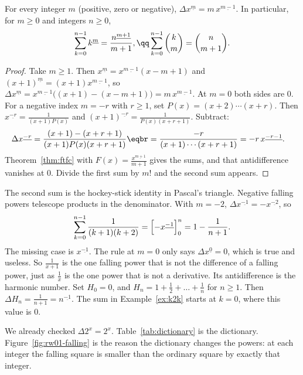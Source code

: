 \begin{proposition}\label{prop:falling}
For every integer $m$ (positive, zero or negative), $\Delta x^{\underline m}=m\,x^{\underline{m-1}}$. In particular,
for $m\ge0$ and integers $n\ge0$,
\[
\sum_{k=0}^{n-1}k^{\underline m}=\frac{n^{\underline{m+1}}}{m+1},\qq\sum_{k=0}^{n-1}\binom km=\binom n{m+1}.
\]
\end{proposition}
\begin{proof}
Take $m\ge1$. Then $x^{\underline m}=x^{\underline{m-1}}(x-m+1)$ and $(x+1)^{\underline m}=(x+1)x^{\underline{m-1}}$, so
$\Delta x^{\underline m}=x^{\underline{m-1}}\bigl((x+1)-(x-m+1)\bigr)=m\,x^{\underline{m-1}}$. At $m=0$ both sides are
$0$. For a negative index $m=-r$ with $r\ge1$, set $P(x)=(x+2)\cdots(x+r)$. Then $x^{\underline{-r}}=\frac1{(x+1)P(x)}$ and
$(x+1)^{\underline{-r}}=\frac1{P(x)(x+r+1)}$. Subtract:
\[
\begin{aligned}\Delta x^{\underline{-r}}&=\frac{(x+1)-(x+r+1)}{(x+1)P(x)(x+r+1)}\eqbr=\frac{-r}{(x+1)\cdots(x+r+1)}=-r\,x^{\underline{-r-1}}.\end{aligned}
\]
Theorem~\ref{thm:ftfc} with $F(x)=\frac{x^{\underline{m+1}}}{m+1}$ gives the sums, and that antidifference vanishes at $0$. Divide the first sum by $m!$ and the second sum appears.
\end{proof}

The second sum is the hockey-stick identity in Pascal's triangle. Negative falling powers telescope products in the denominator. With $m=-2$, $\Delta x^{\underline{-1}}=-x^{\underline{-2}}$, so
\[
\sum_{k=0}^{n-1}\frac1{(k+1)(k+2)}=\Bigl[-x^{\underline{-1}}\Bigr]_0^n=1-\frac1{n+1}.
\]
The missing case is $x^{\underline{-1}}$. The rule at $m=0$ only says $\Delta x^{\underline 0}=0$, which is true and useless. So $\frac1{x+1}$ is the one falling power that is not the difference of a falling power, just as $\frac1x$ is the one power that is not a derivative. Its antidifference is the harmonic number. Set $H_0=0$, and $H_n=1+\frac12+\dots+\frac1n$ for $n\ge1$. Then $\Delta H_n=\frac1{n+1}=n^{\underline{-1}}$. The sum in Example~\ref{ex:k2k} starts at $k=0$, where this value is $0$.

We already checked $\Delta 2^x=2^x$. Table~\ref{tab:dictionary} is the dictionary. Figure~\ref{fig:rw01-falling} is the reason the dictionary changes the powers: at each integer the falling square is smaller than the ordinary square by exactly that integer.

